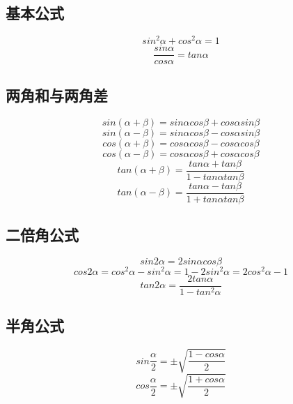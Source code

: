 
\begin{issues}
\issueDraft
\end{issues}

\subsection{基本公式}
\begin{equation}
sin^2\alpha + cos^2\alpha = 1
\end{equation}
\begin{equation}
\frac{sin\alpha}{cos\alpha} = tan\alpha
\end{equation}

\subsection{两角和与两角差}
\begin{equation}
sin(\alpha + \beta) = sin\alpha cos\beta + cos\alpha sin\beta
\end{equation}
\begin{equation}
sin(\alpha - \beta) = sin\alpha cos\beta - cos\alpha sin\beta
\end{equation}
\begin{equation}
cos(\alpha + \beta) = cos\alpha cos\beta - cos\alpha cos\beta
\end{equation}
\begin{equation}
cos(\alpha - \beta) = cos\alpha cos\beta + cos\alpha cos\beta
\end{equation}
\begin{equation}
tan(\alpha + \beta) = \frac{tan\alpha+tan\beta}{1-tan\alpha tan\beta}
\end{equation}
\begin{equation}
tan(\alpha - \beta) = \frac{tan\alpha - tan\beta}{1+tan\alpha tan\beta}
\end{equation}

\subsection{二倍角公式}
\begin{equation}
sin2\alpha = 2sin\alpha cos\beta
\end{equation}
\begin{equation}
cos2\alpha = cos^2\alpha - sin^2\alpha = 1 - 2sin^2\alpha = 2cos^2\alpha -1
\end{equation}
\begin{equation}
tan2\alpha = \frac{2tan\alpha}{1-tan^2\alpha}
\end{equation}

\subsection{半角公式}
\begin{equation}
sin\frac{\alpha}{2} = \pm\sqrt{\frac{1-cos\alpha}{2}}
\end{equation}
\begin{equation}
cos\frac{\alpha}{2}= \pm\sqrt{\frac{1+cos\alpha}{2}}
\end{equation}